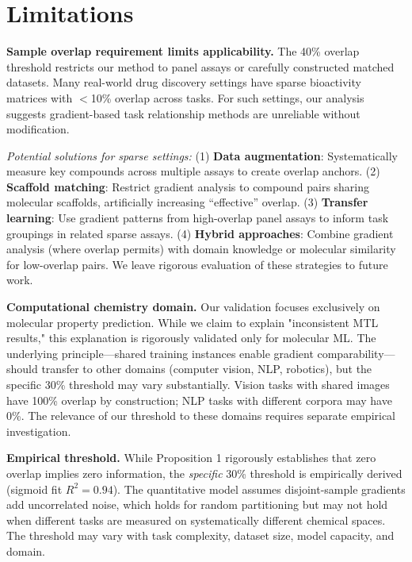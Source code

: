 \documentclass{article}
\begin{document}
\section{Limitations}

\textbf{Sample overlap requirement limits applicability.} The 40\% overlap threshold restricts our method to panel assays or carefully constructed matched datasets. Many real-world drug discovery settings have sparse bioactivity matrices with $<$10\% overlap across tasks. For such settings, our analysis suggests gradient-based task relationship methods are unreliable without modification.

\textit{Potential solutions for sparse settings:} (1) \textbf{Data augmentation}: Systematically measure key compounds across multiple assays to create overlap anchors. (2) \textbf{Scaffold matching}: Restrict gradient analysis to compound pairs sharing molecular scaffolds, artificially increasing ``effective'' overlap. (3) \textbf{Transfer learning}: Use gradient patterns from high-overlap panel assays to inform task groupings in related sparse assays. (4) \textbf{Hybrid approaches}: Combine gradient analysis (where overlap permits) with domain knowledge or molecular similarity for low-overlap pairs. We leave rigorous evaluation of these strategies to future work.

\textbf{Computational chemistry domain.} Our validation focuses exclusively on molecular property prediction. While we claim to explain "inconsistent MTL results," this explanation is rigorously validated only for molecular ML. The underlying principle---shared training instances enable gradient comparability---should transfer to other domains (computer vision, NLP, robotics), but the specific 30\% threshold may vary substantially. Vision tasks with shared images have 100\% overlap by construction; NLP tasks with different corpora may have 0\%. The relevance of our threshold to these domains requires separate empirical investigation.

\textbf{Empirical threshold.} While Proposition 1 rigorously establishes that zero overlap implies zero information, the \textit{specific} 30\% threshold is empirically derived (sigmoid fit $R^2 = 0.94$). The quantitative model assumes disjoint-sample gradients add uncorrelated noise, which holds for random partitioning but may not hold when different tasks are measured on systematically different chemical spaces. The threshold may vary with task complexity, dataset size, model capacity, and domain.
\end{document}
